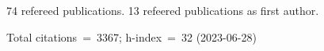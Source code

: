 74 refereed publications. 13 refeered publications as first author.

Total citations~=~3367; h-index~=~32 (2023-06-28)